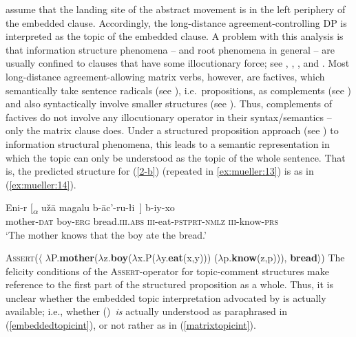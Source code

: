 \documentclass[output=paper
,modfonts
,nonflat]{langsci/langscibook}
\begin{document}
\citet{PolinskyPotsdam:01} assume that the landing site of the
abstract movement is in the left periphery of the embedded
	clause. Accordingly, the long-distance agreement-controlling DP is
	interpreted as the topic of the embedded clause. A problem with this
	analysis is that information structure phenomena -- and root phenomena
	in general -- are usually confined to clauses that have some
	illocutionary force; see \citet{HooperThompson:73},
	\citet{Ebertetal08}, \citet{Krifkainprep}, and \citet{Maticetal14}. Most long-distance agreement-allowing
	matrix verbs, however, are factives, which semantically take sentence
	radicals (see \citealt{Stenius67}), i.e.~propositions, as complements (see \citealt{Krifka04})
	and also syntactically involve smaller
	structures (see \citealt{deCubaUrogdi10}). Thus, complements of
	factives do not involve any illocutionary operator in their
	syntax/semantics -- only the matrix clause does. Under a structured
	proposition approach  (see \citealt{Krifka92}) to information structural
	phenomena, this leads to a semantic representation in which the topic
	can only be understood as the topic of the whole sentence. That is,
	the predicted structure for (\ref{2-b})  (repeated in
	\ref{ex:mueller:13}) is as in (\ref{ex:mueller:14}).
	
	
	\ea\label{ex:mueller:13}
	\gll    Eni-r [\textsubscript{{$\alpha$}} u\v{z}\={a} \label{2d-b}magalu b-\={a}c'-ru-\l i~] b-iy-xo \\
	mother-{\scshape dat} {} boy-{\scshape erg} bread.{\scshape iii.abs} {\scshape iii}-eat-{\scshape pstprt-nmlz} {\scshape iii}-know-{\scshape prs} \\
	\glt      `The mother knows that the boy ate the bread.'
	\z
	
	\ea\label{ex:mueller:14} {\scshape Assert}($\langle$ $\lambda$P.{\bfseries mother}($\lambda$z.{\bfseries boy}($\lambda$x.P($\lambda$y.{\bfseries eat}(x,y))) ($\lambda$p.{\bfseries know}(z,p))), {\bfseries bread}$\rangle$)\z
	The felicity conditions of the {\scshape Assert}-operator for topic-comment structures\linebreak
	make reference to the first part of the structured
	proposition as a whole. Thus, it is unclear whether the embedded topic interpretation
	advocated by \cite{PolinskyPotsdam:01}  is actually available;
	i.e.,  whether (\LLast)\ {\itshape is} actually understood as paraphrased in (\ref{embeddedtopicint}), or not rather as in (\ref{matrixtopicint}).
	
\end{document}
